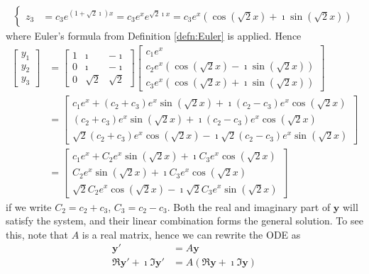 \begin{solution}
\begin{align*}
\begin{cases}
z_3 &= c_3e^{(1+\sqrt{2}\imath)x} = c_3e^{x}e^{\sqrt{2}\imath x} = c_3e^{x}(\cos(\sqrt{2}x) + \imath\sin(\sqrt{2}x))
\end{cases}
\end{align*}
where Euler's formula from Definition \ref{defn:Euler} is applied. Hence 
\begin{align*}
\begin{bmatrix}
y_1 \\
y_2 \\
y_3 
\end{bmatrix}
&=
\begin{bmatrix}
1 & \imath & -\imath \\
0 & \imath & -\imath \\
0 & \sqrt{2} & \sqrt{2} 
\end{bmatrix}
\begin{bmatrix}
c_1e^x \\
c_2e^{x}(\cos(\sqrt{2}x) - \imath\sin(\sqrt{2}x)) \\
c_3e^{x}(\cos(\sqrt{2}x) + \imath\sin(\sqrt{2}x))
\end{bmatrix} \\
&= 
\begin{bmatrix}
c_1 e^x + (c_2+c_3)e^{x}\sin(\sqrt{2}x) + \imath(c_2-c_3)e^{x}\cos(\sqrt{2}x) \\
(c_2+c_3)e^{x}\sin(\sqrt{2}x) + \imath(c_2-c_3)e^{x}\cos(\sqrt{2}x) \\
\sqrt{2}(c_2+c_3)e^{x}\cos(\sqrt{2}x) - \imath\sqrt{2}(c_2-c_3)e^{x}\sin(\sqrt{2}x)
\end{bmatrix} \\
&= 
\begin{bmatrix}
c_1 e^x + C_2e^{x}\sin(\sqrt{2}x) + \imath C_3e^{x}\cos(\sqrt{2}x) \\
C_2e^{x}\sin(\sqrt{2}x) + \imath C_3e^{x}\cos(\sqrt{2}x) \\
\sqrt{2}C_2e^{x}\cos(\sqrt{2}x) - \imath \sqrt{2}C_3e^{x}\sin(\sqrt{2}x)
\end{bmatrix}
\end{align*}
if we write $C_2 = c_2 + c_3$, $C_3 = c_2 - c_3$. Both the real and imaginary part of $\textbf{y}$ will satisfy the system, and their linear combination forms the general solution. To see this, note that $A$ is a real matrix, hence we can rewrite the ODE as
\begin{align*}
\textbf{y}' &= A\textbf{y} \\
\Re{\textbf{y}'} + \imath\Im{\textbf{y}'} &= A(\Re{\textbf{y}} + \imath\Im{\textbf{y}}) \\

\end{align*}
\end{solution}
